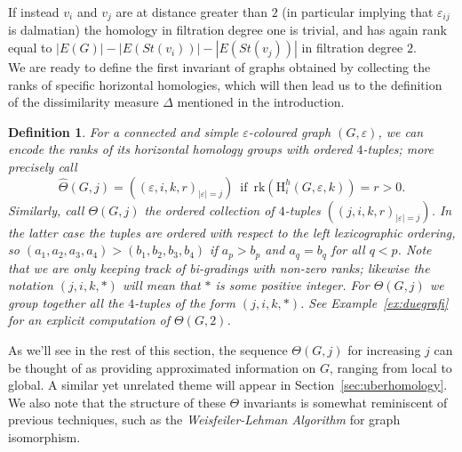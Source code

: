 \documentclass[11pt, a4paper, reqno, twoside, makeidx]{amsart}
\theoremstyle{remark}
\theoremstyle{plain}
\newtheorem{defi}[thm]{Definition}
\theoremstyle{definition}
\newcommand{\HH}{\mathrm{H}}
\begin{document}
If instead $v_i$ and $v_j$ are at distance greater than $2$ (in particular implying that $\varepsilon_{ij}$ is dalmatian) the homology in filtration degree one is trivial, and has again rank equal to $|E(G)| - |E(St(v_i))|- |E(St(v_j))|$ in filtration degree $2$.\\

We are ready to define the first invariant of graphs obtained by collecting the ranks of specific horizontal homologies, which will then lead us to the definition of the dissimilarity measure $\Delta$ mentioned in the introduction.


\begin{defi}
For a connected and simple $\varepsilon$-coloured graph $(G, \varepsilon)$, we can encode the ranks of its horizontal homology groups with ordered $4$-tuples; more precisely call $$\widehat{\Theta}(G,j) = \left( \left( \varepsilon, i, k,r\right)_{|\varepsilon| = j} \right)\, \text{ if }\,\mathrm{rk}(\HH^h_i(G,\varepsilon, k)) = r>0.$$ Similarly, call  $\Theta (G,j)$ the ordered collection of $4$-tuples $\left(\left( j, i, k,r\right)_{|\varepsilon| = j} \right)$.
In the latter case the tuples are ordered with respect to the left lexicographic ordering, so $(a_1,a_2,a_3,a_4) > (b_1,b_2,b_3,b_4)$ if $a_p > b_p$ and $a_q = b_q$ for all $q<p$. 
Note that we are only keeping track of bi-gradings with non-zero ranks; likewise the notation $(j,i,k,*)$ will mean that $*$ is some positive integer. For $\Theta(G,j)$ we group together all the $4$-tuples of the form $(j,i,k,*)$. See Example~\ref{ex:duegrafi} for an explicit computation of $\Theta(G,2)$. 
\end{defi}
As we'll see in the rest of this section, the sequence $\Theta (G,j)$ for increasing $j$ can be thought of as providing approximated 
information on $G$, ranging from local to global. A similar yet unrelated theme will appear in Section~\ref{sec:uberhomology}.\\
We also note that the structure of these $\Theta$ invariants is somewhat reminiscent of previous techniques, such as the \emph{Weisfeiler-Lehman Algorithm} \cite{furer2017combinatorial} for graph isomorphism.
\end{document}
